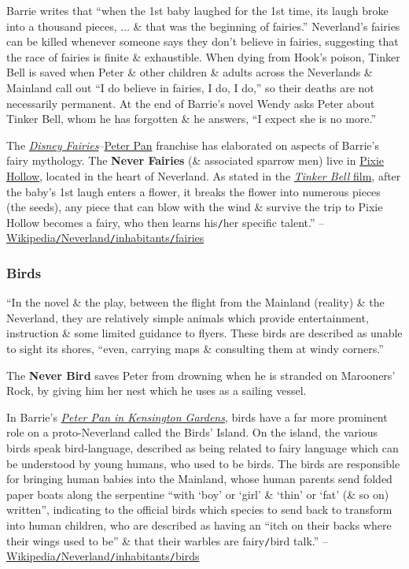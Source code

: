 \documentclass[oneside]{book}
\numberwithin{equation}{section}
\begin{document}
Barrie writes that ``when the 1st baby laughed for the 1st time, its laugh broke into a thousand pieces, $\ldots$ \& that was the beginning of fairies.'' Neverland's fairies can be killed whenever someone says they don't believe in fairies, suggesting that the race of fairies is finite \& exhaustible. When dying from Hook's poison, Tinker Bell is saved when Peter \& other children \& adults across the Neverlands \& Mainland call out ``I do believe in fairies, I do, I do,'' so their deaths are not necessarily permanent. At the end of Barrie's novel Wendy asks Peter about Tinker Bell, whom he has forgotten \& he answers, ``I expect she is no more.''

The \href{https://en.wikipedia.org/wiki/Disney_Fairies}{\textit{Disney Fairies}}--\href{https://en.wikipedia.org/wiki/Peter_Pan_(franchise)}{Peter Pan} franchise has elaborated on aspects of Barrie's fairy mythology. The \textbf{Never Fairies} (\& associated sparrow men) live in \href{https://en.wikipedia.org/wiki/Pixie_Hollow}{Pixie Hollow}, located in the heart of Neverland. As stated in the \href{https://en.wikipedia.org/wiki/Tinker_Bell_(film)}{\textit{Tinker Bell} film}, after the baby's 1st laugh enters a flower, it breaks the flower into numerous pieces (the seeds), any piece that can blow with the wind \& survive the trip to Pixie Hollow becomes a fairy, who then learns his\texttt{/}her specific talent.'' -- \href{https://en.wikipedia.org/wiki/Neverland#Fairies}{Wikipedia\texttt{/}Neverland\texttt{/}inhabitants\texttt{/}fairies}

\subsubsection{Birds}
``In the novel \& the play, between the flight from the Mainland (reality) \& the Neverland, they are relatively simple animals which provide entertainment, instruction \& some limited guidance to flyers. These birds are described as unable to sight its shores, ``even, carrying maps \& consulting them at windy corners.''

The \textbf{Never Bird} saves Peter from drowning when he is stranded on Marooners' Rock, by giving him her nest which he uses as a sailing vessel.

In Barrie's \href{https://en.wikipedia.org/wiki/Peter_Pan_in_Kensington_Gardens}{\textit{Peter Pan in Kensington Gardens}}, birds have a far more prominent role on a proto-Neverland called the Birds' Island. On the island, the various birds speak bird-language, described as being related to fairy language which can be understood by young humans, who used to be birds. The birds are responsible for bringing human babies into the Mainland, whose human parents send folded paper boats along the serpentine ``with `boy' or `girl' \& `thin' or `fat' (\& so on) written'', indicating to the official birds which species to send back to transform into human children, who are described as having an ``itch on their backs where their wings used to be'' \& that their warbles are fairy\texttt{/}bird talk.'' -- \href{https://en.wikipedia.org/wiki/Neverland#Birds}{Wikipedia\texttt{/}Neverland\texttt{/}inhabitants\texttt{/}birds}
\end{document}
